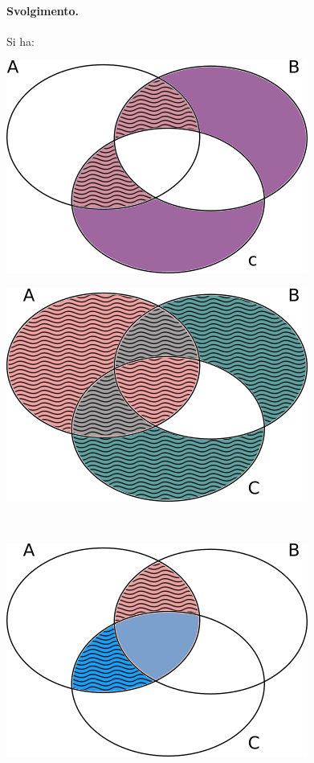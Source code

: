 \paragraph{Svolgimento.} Si ha:
\begin{center}
	\begin{minipage}{.45\textwidth}
		\centering
		\includegraphics[scale=.5]{res/Venn_Esercizio6.png}
	\end{minipage}
	\begin{minipage}{.45\textwidth}
		\centering
		\includegraphics[scale=.5]{res/Venn_Esercizio7.png}
	\end{minipage} \\
	\begin{minipage}{.45\textwidth}
		\centering
		\includegraphics[scale=.5]{res/Venn_Esercizio8.png}

\end{minipage}
\end{center}

